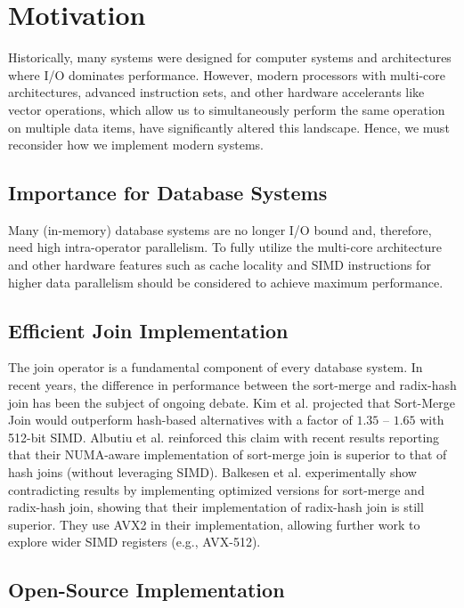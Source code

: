 \section{Motivation}
\label{sec:motivation}

Historically, many systems were designed for computer systems and architectures where I/O dominates
performance. However, modern processors with multi-core architectures, advanced 
instruction sets, and other hardware accelerants like vector operations, which allow us to
simultaneously perform the same operation on multiple data items, have significantly altered this
landscape. Hence, we must reconsider how we implement modern systems.

\subsection{Importance for Database Systems}

Many (in-memory) database systems are no longer I/O bound and, therefore, need high intra-operator
parallelism. To fully utilize the multi-core architecture and other hardware features such as cache
locality and SIMD instructions for higher data parallelism should be considered to achieve maximum
performance.

\subsection{Efficient Join Implementation}
The join operator is a fundamental component of every database system.
In recent years, the difference in performance between the sort-merge and radix-hash join has been
the subject of ongoing debate. Kim et al. \cite{10.14778/1687553.1687564} projected that Sort-Merge Join would outperform hash-based
alternatives with a factor of $1.35$ – $1.65$ with 512-bit SIMD. Albutiu et al. \cite{MPSM} reinforced this claim with recent results reporting that
their NUMA-aware implementation of sort-merge join is superior to that of hash joins (without
leveraging SIMD). Balkesen et al. \cite{Balkesen} experimentally show contradicting results by implementing 
optimized versions for sort-merge and radix-hash join, showing that their implementation of
radix-hash join is still superior. They use AVX2 in their implementation, allowing further
work to explore wider SIMD registers (e.g., AVX-512).

\subsection{Open-Source Implementation}

